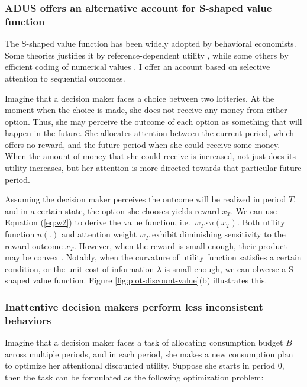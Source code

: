 \documentclass[
  12pt,
]{article}
\begin{document}
\hypertarget{adus-offers-an-alternative-account-for-s-shaped-value-function}{%
\subsubsection{ADUS offers an alternative account for S-shaped value
function}\label{adus-offers-an-alternative-account-for-s-shaped-value-function}}

The S-shaped value function has been widely adopted by behavioral
economists. Some theories justifies it by reference-dependent utility
\citep{kahneman_prospect_1979, koszegi_model_2006}, while some others by
efficient coding of numerical values \citep{frydman_efficient_2021}. I
offer an account based on selective attention to sequential outcomes.

Imagine that a decision maker faces a choice between two lotteries. At
the moment when the choice is made, she does not receive any money from
either option. Thus, she may perceive the outcome of each option as
something that will happen in the future. She allocates attention
between the current period, which offers no reward, and the future
period when she could receive some money. When the amount of money that
she could receive is increased, not just does its utility increases, but
her attention is more directed towards that particular future period.

Assuming the decision maker perceives the outcome will be realized in
period \(T\), and in a certain state, the option she chooses yields
reward \(x_T\). We can use Equation (\ref{eq:w2}) to derive the value
function, i.e.~\(w_T\cdot u(x_T)\). Both utility function \(u(.)\) and
attention weight \(w_T\) exhibit diminishing sensitivity to the reward
outcome \(x_T\). However, when the reward is small enough, their product
may be convex . Notably, when the curvature of utility function
satisfies a certain condition, or the unit cost of information
\(\lambda\) is small enough, we can obverse a S-shaped value function.
Figure \ref{fig:plot-discount-value}(b) illustrates this.

\hypertarget{inattentive-decision-makers-perform-less-inconsistent-behaviors}{%
\subsubsection{Inattentive decision makers perform less inconsistent
behaviors}\label{inattentive-decision-makers-perform-less-inconsistent-behaviors}}

Imagine that a decision maker faces a task of allocating consumption
budget \(B\) across multiple periods, and in each period, she makes a
new consumption plan to optimize her attentional discounted utility.
Suppose she starts in period 0, then the task can be formulated as the
following optimization problem:
\end{document}
